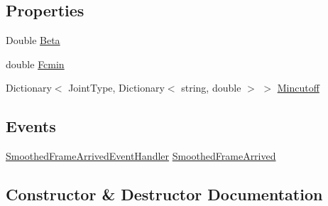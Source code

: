 \subsection*{Properties}
\begin{DoxyCompactItemize}
\item 
Double \hyperlink{class_rowing_monitor_1_1_model_1_1_one_euro_filter_smoothing_abbe908f1d7748febfc27336f42b95a6f}{Beta}
\item 
double \hyperlink{class_rowing_monitor_1_1_model_1_1_one_euro_filter_smoothing_ada991e92f7ecbde83ab171a585f6d6d2}{Fcmin}
\item 
Dictionary$<$ Joint\+Type, Dictionary$<$ string, double $>$ $>$ \hyperlink{class_rowing_monitor_1_1_model_1_1_one_euro_filter_smoothing_a9763ac7c63ca0ad07c8a0a00f645a9fc}{Mincutoff}
\end{DoxyCompactItemize}
\subsection*{Events}
\begin{DoxyCompactItemize}
\item 
\hyperlink{class_rowing_monitor_1_1_model_1_1_one_euro_filter_smoothing_a22becc35eb5432a3a90b8e61d5c8171f}{Smoothed\+Frame\+Arrived\+Event\+Handler} \hyperlink{class_rowing_monitor_1_1_model_1_1_one_euro_filter_smoothing_ad6eddf578afaace11e6d1f1a74ff018a}{Smoothed\+Frame\+Arrived}
\end{DoxyCompactItemize}


\subsection{Constructor \& Destructor Documentation}
\mbox{\label{class_rowing_monitor_1_1_model_1_1_one_euro_filter_smoothing_a1c3c89d4e59552370c5c0d56edac8a19}} 
